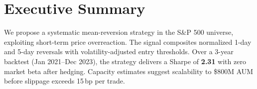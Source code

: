 \section{Executive Summary}

We propose a systematic mean-reversion strategy in the S\&P 500 universe,
exploiting short-term price overreaction. The signal composites normalized
1-day and 5-day reversals with volatility-adjusted entry thresholds. Over a
3-year backtest (Jan 2021--Dec 2023), the strategy delivers a Sharpe of
\textbf{2.31} with zero market beta after hedging. Capacity estimates
suggest scalability to \$800M AUM before slippage exceeds 15\,bp per trade.
